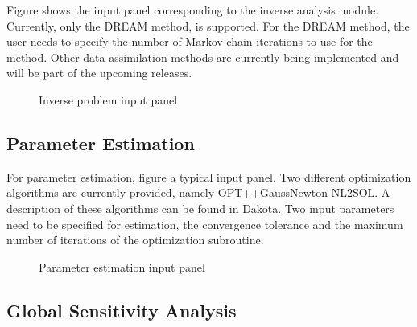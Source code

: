 Figure  shows the input panel corresponding to the inverse analysis module. Currently, only the DREAM method, is supported. For the DREAM method, the user needs to specify the number of Markov chain iterations to use for the method. Other data assimilation methods are currently being implemented and will be part of the upcoming releases. 


\begin{figure}[!htbp]
  \caption{Inverse problem input panel}
  \label{fig:inv}
\end{figure}

\subsection{Parameter Estimation}

For parameter estimation, figure  a typical input panel. Two different optimization algorithms are currently provided, namely OPT++GaussNewton NL2SOL. A description of these algorithms can be found in Dakota. Two input parameters need to be specified for estimation, the convergence tolerance and the maximum number of iterations of the optimization subroutine. 

\begin{figure}[!htbp]
  \caption{Parameter estimation input panel}
  \label{fig:pe}
\end{figure}


\subsection{Global Sensitivity Analysis}

